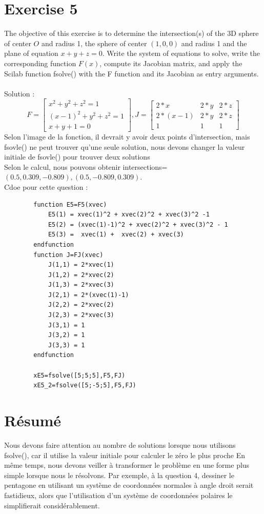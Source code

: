 \documentclass[11pt]{article}
\begin{document}
    \section*{Exercise 5}
    The objective of this exercise is to determine the intersection(s) of the 3D sphere of center $O$ and radius 1, the sphere of center $(1,0,0)$ and radius 1 and the plane of equation $x + y +z = 0$. Write the system of equations to solve, write the corresponding function $F(x)$, compute its Jacobian matrix, and apply the Scilab function fsolve() with the F function and its Jacobian as entry arguments.\\
    ~\\
    Solution :
    $$
    F=
    \begin{bmatrix}
        x^2+y^2+z^2=1\\
        (x-1)^2+y^2+z^2=1\\
        x+y+1=0
    \end{bmatrix}
    ,
    J=
    \begin{bmatrix}
        2*x & 2*y & 2*z\\
        2*(x-1) & 2*y & 2*z\\
        1 & 1 & 1
    \end{bmatrix}
    $$
    Selon l'image de la fonction, il devrait y avoir deux points d'intersection, mais fsovle() ne peut trouver qu'une seule solution, nous devons changer la valeur initiale de fsovle() pour trouver deux solutions\\
    Selon le calcul, nous pouvons obtenir intersections=$(0.5,0.309,-0.809),(0.5,-0.809,0.309)$. 
    ~\\
    Cdoe pour cette question :
    \begin{verbatim}
        function E5=F5(xvec)
            E5(1) = xvec(1)^2 + xvec(2)^2 + xvec(3)^2 -1
            E5(2) = (xvec(1)-1)^2 + xvec(2)^2 + xvec(3)^2 - 1
            E5(3) =  xvec(1) +  xvec(2) + xvec(3)
        endfunction
        function J=FJ(xvec)
            J(1,1) = 2*xvec(1)
            J(1,2) = 2*xvec(2)
            J(1,3) = 2*xvec(3)
            J(2,1) = 2*(xvec(1)-1)
            J(2,2) = 2*xvec(2)
            J(2,3) = 2*xvec(3)
            J(3,1) = 1
            J(3,2) = 1
            J(3,3) = 1
        endfunction

        xE5=fsolve([5;5;5],F5,FJ)
        xE5_2=fsolve([5;-5;5],F5,FJ)
    \end{verbatim}
    \section*{Résumé}
    Nous devons faire attention au nombre de solutions lorsque nous utilisons fsolve(), car il utilise la valeur initiale pour calculer le zéro le plus proche
    En même temps, nous devons veiller à transformer le problème en une forme plus simple lorsque nous le résolvons.
    Par exemple, à la question 4, dessiner le pentagone en utilisant un système de coordonnées normales à angle droit serait fastidieux, alors que l'utilisation d'un système de coordonnées polaires le simplifierait considérablement.
\end{document}
